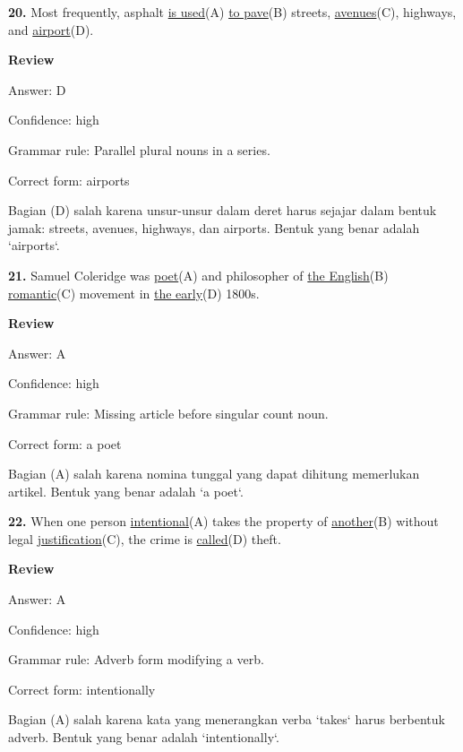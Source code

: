 \documentclass[12pt]{article}
\begin{document}
\endgroup
\par
\vspace{\questionblockgap}
\noindent\textbf{20.} Most frequently, asphalt \uline{is used}(A) \uline{to pave}(B) streets, \uline{avenues}(C), highways, and \uline{airport}(D).
\par
\begingroup
\setlength{\parskip}{0pt}
\setlength{\parindent}{0pt}
\textbf{Review}\par
Answer: D\par
Confidence: high\par
Grammar rule: Parallel plural nouns in a series.\par
Correct form: airports\par
Bagian (D) salah karena unsur-unsur dalam deret harus sejajar dalam bentuk jamak: streets, avenues, highways, dan airports. Bentuk yang benar adalah `airports`.\par
\endgroup
\par
\vspace{\questionblockgap}
\noindent\textbf{21.} Samuel Coleridge was \uline{poet}(A) and philosopher of \uline{the English}(B) \uline{romantic}(C) movement in \uline{the early}(D) 1800s.
\par
\begingroup
\setlength{\parskip}{0pt}
\setlength{\parindent}{0pt}
\textbf{Review}\par
Answer: A\par
Confidence: high\par
Grammar rule: Missing article before singular count noun.\par
Correct form: a poet\par
Bagian (A) salah karena nomina tunggal yang dapat dihitung memerlukan artikel. Bentuk yang benar adalah `a poet`.\par
\endgroup
\par
\vspace{\questionblockgap}
\noindent\textbf{22.} When one person \uline{intentional}(A) takes the property of \uline{another}(B) without legal \uline{justification}(C), the crime is \uline{called}(D) theft.
\par
\begingroup
\setlength{\parskip}{0pt}
\setlength{\parindent}{0pt}
\textbf{Review}\par
Answer: A\par
Confidence: high\par
Grammar rule: Adverb form modifying a verb.\par
Correct form: intentionally\par
Bagian (A) salah karena kata yang menerangkan verba `takes` harus berbentuk adverb. Bentuk yang benar adalah `intentionally`.\par
\end{document}
